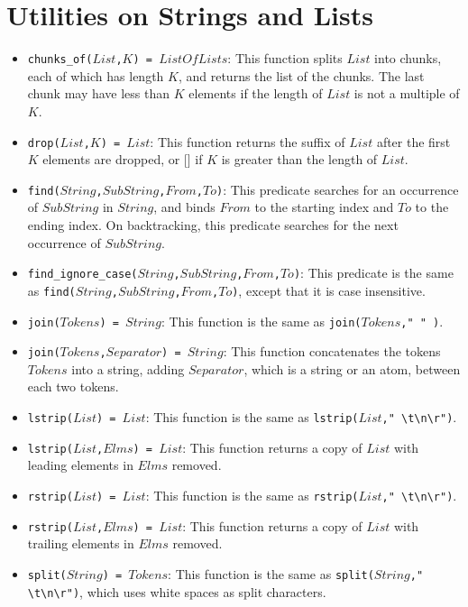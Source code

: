 \section{Utilities on Strings and Lists}
\begin{itemize}
\item \texttt{chunks\_of($List$,$K$) = $ListOfLists$}: This function splits $List$ into chunks, each of which has length $K$, and returns the list of the chunks. The last chunk may have less than $K$ elements if the length of $List$ is not a multiple of $K$.
\item \texttt{drop($List$,$K$) = $List$}: This function returns the suffix of $List$ after the first $K$ elements are dropped, or [] if $K$ is greater than the length of $List$.
\item \texttt{find($String$,$SubString$,$From$,$To$)}: This predicate searches for an occurrence of $SubString$ in $String$, and binds $From$ to the starting index and $To$ to the ending index. On backtracking, this predicate searches for the next occurrence of $SubString$.
\item \texttt{find\_ignore\_case($String$,$SubString$,$From$,$To$)}: This predicate is the same as \texttt{find($String$,$SubString$,$From$,$To$)}, except that it is case insensitive.
\item \texttt{join($Tokens$) = $String$}: This function is the same as \texttt{join($Tokens$," " )}.
\item \texttt{join($Tokens$,$Separator$) = $String$}: This function concatenates the tokens $Tokens$ into a string, adding $Separator$, which is a string or an atom, between each two tokens.
\item \texttt{lstrip($List$) = $List$}: This function is the same as \texttt{lstrip($List$,}\verb+" \t\n\r")+. 
\item \texttt{lstrip($List$,$Elms$) = $List$}: This function returns a copy of $List$ with leading  elements in $Elms$ removed.
\item \texttt{rstrip($List$) = $List$}: This function is the same as \texttt{rstrip($List$,}\verb+" \t\n\r")+.
\item \texttt{rstrip($List$,$Elms$) = $List$}: This function returns a copy of $List$ with trailing elements in $Elms$ removed.
\item \texttt{split($String$) = $Tokens$}: This function is the same as \texttt{split($String$,}\verb+" \t\n\r")+, which uses white spaces as split characters.

\end{itemize}
